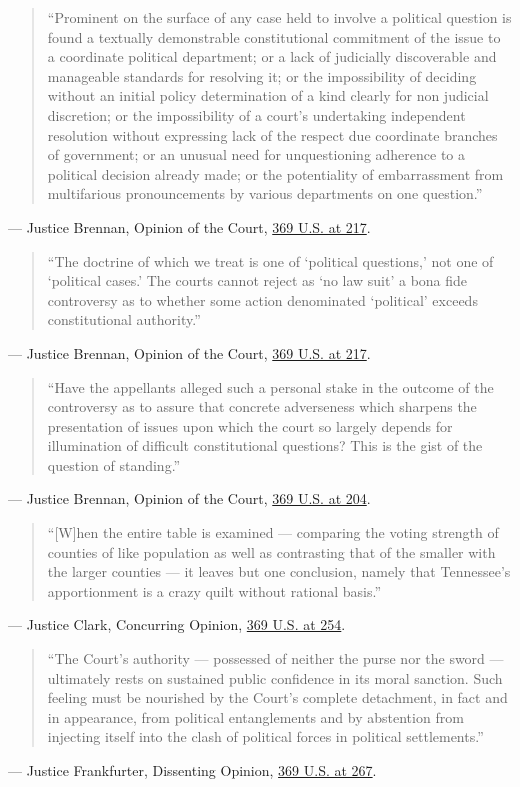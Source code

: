 \documentclass[12pt]{article}
\begin{document}
\begin{quote}
``Prominent on the surface of any case held to involve a political question is found a textually demonstrable constitutional commitment of the issue to a coordinate political department; or a lack of judicially discoverable and manageable standards for resolving it; or the impossibility of deciding without an initial policy determination of a kind clearly for non judicial discretion; or the impossibility of a court's undertaking independent resolution without expressing lack of the respect due coordinate branches of government; or an unusual need for unquestioning adherence to a political decision already made; or the potentiality of embarrassment from multifarious pronouncements by various departments on one question.''
\end{quote}
\noindent --- Justice Brennan, Opinion of the Court, \href{https://supreme.justia.com/cases/federal/us/369/186/}{369 U.S. at 217}.

\begin{quote}
``The doctrine of which we treat is one of `political questions,' not one of `political cases.' The courts cannot reject as `no law suit' a bona fide controversy as to whether some action denominated `political' exceeds constitutional authority.''
\end{quote}
\noindent --- Justice Brennan, Opinion of the Court, \href{https://supreme.justia.com/cases/federal/us/369/186/}{369 U.S. at 217}.

\begin{quote}
``Have the appellants alleged such a personal stake in the outcome of the controversy as to assure that concrete adverseness which sharpens the presentation of issues upon which the court so largely depends for illumination of difficult constitutional questions? This is the gist of the question of standing.''
\end{quote}
\noindent --- Justice Brennan, Opinion of the Court, \href{https://supreme.justia.com/cases/federal/us/369/186/}{369 U.S. at 204}.

\begin{quote}
``[W]hen the entire table is examined --- comparing the voting strength of counties of like population as well as contrasting that of the smaller with the larger counties --- it leaves but one conclusion, namely that Tennessee's apportionment is a crazy quilt without rational basis.''
\end{quote}
\noindent --- Justice Clark, Concurring Opinion, \href{https://supreme.justia.com/cases/federal/us/369/186/}{369 U.S. at 254}.

\begin{quote}
``The Court's authority --- possessed of neither the purse nor the sword --- ultimately rests on sustained public confidence in its moral sanction. Such feeling must be nourished by the Court's complete detachment, in fact and in appearance, from political entanglements and by abstention from injecting itself into the clash of political forces in political settlements.''
\end{quote}
\noindent --- Justice Frankfurter, Dissenting Opinion, \href{https://supreme.justia.com/cases/federal/us/369/186/}{369 U.S. at 267}.
\end{document}
